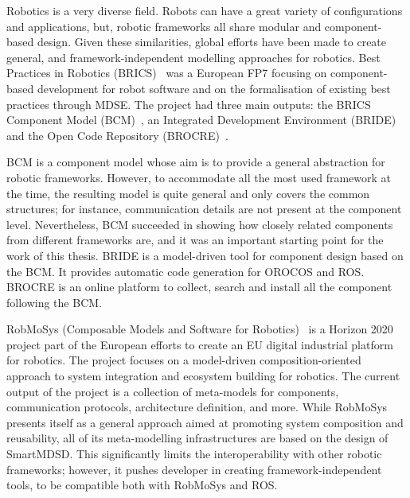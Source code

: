 Robotics is a very diverse field. Robots can have a great variety of configurations and applications, but, robotic frameworks all share modular and component-based design. Given these similarities, global efforts have been made to create general, and framework-independent modelling approaches for robotics. Best Practices in Robotics (BRICS)~\cite{bischoff2010brics} was a European FP7 focusing on component-based development for robot software and on the formalisation of existing best practices through MDSE. The project had three main outputs: the BRICS Component Model (BCM)~\cite{bruyninckx2013brics}, an Integrated Development Environment (BRIDE)~\cite{bubeck2014bride} and the Open Code Repository (BROCRE)~\cite{kraetzschmar2010specifications}.

BCM is a component model whose aim is to provide a general abstraction for robotic frameworks. However, to accommodate all the most used framework at the time, the resulting model is quite general and only covers the common structures; for instance, communication details are not present at the component level. Nevertheless, BCM succeeded in showing how closely related components from different frameworks are, and it was an important starting point for the work of this thesis. BRIDE is a model-driven tool for component design based on the BCM. It provides automatic code generation for OROCOS and ROS. BROCRE is an online platform to collect, search and install all the component following the BCM.

RobMoSys (Composable Models and Software for Robotics)~\cite{robmosys} is a Horizon 2020 project part of the European efforts to create an EU digital industrial platform for robotics. The project focuses on a model-driven composition-oriented approach to system integration and ecosystem building for robotics. The current output of the project is a collection of meta-models for components, communication protocols, architecture definition, and more. While RobMoSys presents itself as a general approach aimed at promoting system composition and reusability, all of its meta-modelling infrastructures are based on the design of SmartMDSD. This significantly limits the interoperability with other robotic frameworks; however, it pushes developer in creating framework-independent tools, to be compatible both with RobMoSys and ROS.

